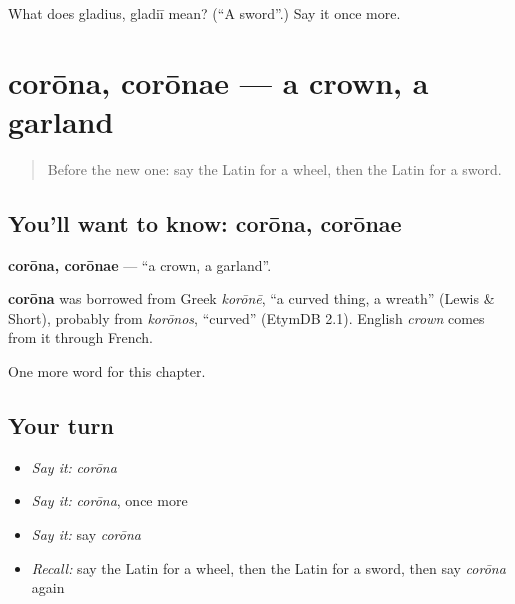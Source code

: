 \begin{tcolorbox}[breakable,colback=teal!4,colframe=teal!35!black,title={Before you move on}]
What does gladius, gladiī mean? (\textquotedblleft{}A sword\textquotedblright{}.) Say it once more.
\end{tcolorbox}
\section[corōna, corōnae]{corōna, corōnae — a crown, a garland}

\label{lesson:LA-C85-corona}



\begin{quote}
Before the new one: say the Latin for a wheel, then the Latin for a sword.
\end{quote}

\subsection*{You'll want to know: corōna, corōnae}
\textbf{corōna, corōnae} — \textquotedblleft{}a crown, a garland\textquotedblright{}.

\begin{cousinweb}
\textbf{corōna} was borrowed from Greek \emph{korōnē}, \textquotedblleft{}a curved thing, a wreath\textquotedblright{} (Lewis \& Short), probably from \emph{korōnos}, \textquotedblleft{}curved\textquotedblright{} (EtymDB 2.1). English \emph{crown} comes from it through French.
\end{cousinweb}

\begin{grammarlens}[title={What you've built}]
One more word for this chapter.
\end{grammarlens}

\subsection*{Your turn}
\begin{itemize}
\raggedright
  \item \emph{Say it:} \emph{corōna}
  \item \emph{Say it:} \emph{corōna}, once more
  \item \emph{Say it:} say \emph{corōna}
  \item \emph{Recall:} say the Latin for a wheel, then the Latin for a sword, then say \emph{corōna} again
\end{itemize}

